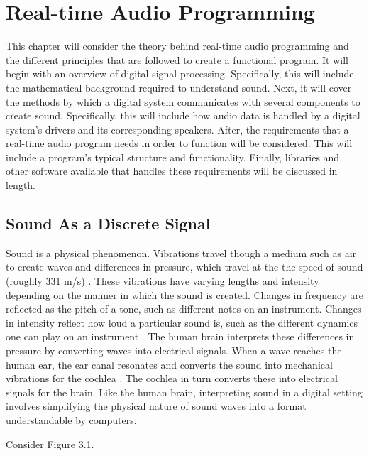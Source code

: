 \chapter{Real-time Audio Programming}
\hspace*{-0.15cm}This chapter will consider the theory behind real-time audio programming and the different principles that are followed to create a functional program. It will begin with an overview of digital signal processing. Specifically, this will include the mathematical background required to understand sound. Next, it will cover the methods by which a digital system communicates with several components to create sound. Specifically, this will include how audio data is handled by a digital system's drivers and its corresponding speakers. After, the requirements that a real-time audio program needs in order to function will be considered. This will include a program's typical structure and functionality. Finally, libraries and other software available that handles these requirements will be discussed in length.

\section{Sound As a Discrete Signal}
Sound is a physical phenomenon. Vibrations travel though a medium such as air to create waves and differences in pressure, which travel at the the speed of sound (roughly 331 m/s) \cite{Ling_2016}. These vibrations have varying lengths and intensity depending on the manner in which the sound is created. Changes in frequency are reflected as the pitch of a tone, such as different notes on an instrument. Changes in intensity reflect how loud a particular sound is, such as the different dynamics one can play on an instrument \cite{Ling_2016}. The human brain interprets these differences in pressure by converting waves into electrical signals. When a wave reaches the human ear, the ear canal resonates and converts the sound into mechanical vibrations for the cochlea \cite{Ling_2016}. The cochlea in turn converts these into electrical signals for the brain. Like the human brain, interpreting sound in a digital setting involves simplifying the physical nature of sound waves into a format understandable by computers.

Consider Figure 3.1.

